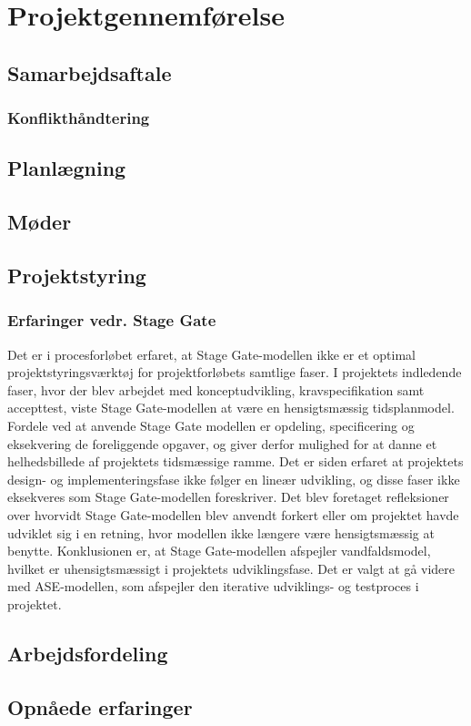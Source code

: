 \chapter{Projektgennemførelse}

\section{Samarbejdsaftale}

	\subsection{Konflikthåndtering}

\section{Planlægning}
\section{Møder}
\section{Projektstyring}

	\subsection{Erfaringer vedr. Stage Gate}

	Det er i procesforløbet erfaret, at Stage Gate-modellen ikke er et optimal  projektstyringsværktøj for projektforløbets samtlige faser.
	I projektets indledende faser, hvor der blev arbejdet med konceptudvikling, kravspecifikation samt accepttest, viste Stage Gate-modellen at være en hensigtsmæssig tidsplanmodel. Fordele ved at anvende Stage Gate modellen er opdeling, specificering og eksekvering de foreliggende opgaver, og giver derfor mulighed for at danne et helhedsbillede af projektets tidsmæssige ramme. Det er siden erfaret at projektets design- og implementeringsfase ikke følger en lineær udvikling, og disse faser ikke eksekveres som Stage Gate-modellen foreskriver. Det blev foretaget refleksioner over hvorvidt Stage Gate-modellen blev anvendt forkert eller om projektet havde udviklet sig i en retning, hvor modellen ikke længere være hensigtsmæssig at benytte. Konklusionen er, at Stage Gate-modellen afspejler vandfaldsmodel, hvilket er uhensigtsmæssigt i projektets udviklingsfase. Det er valgt at gå videre med ASE-modellen, som afspejler den iterative udviklings- og testproces i projektet. 
	
\section{Arbejdsfordeling}


\section{Opnåede erfaringer}
